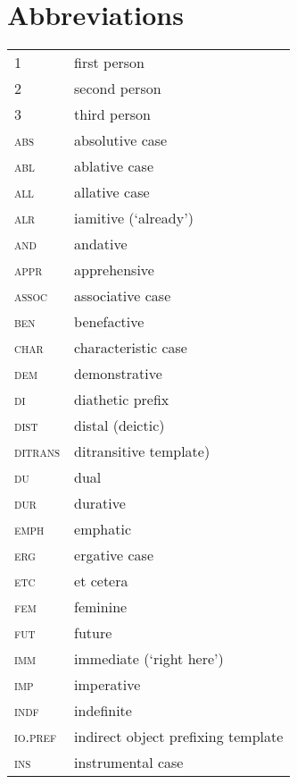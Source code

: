 \documentclass[output=paper]{langscibook}
\begin{document}
\section*{Abbreviations}

\begin{tabularx}{.45\textwidth}{lQ}
        \textsc{1} & {first person}\\
		\textsc{2} & {second person}\\
		\textsc{3} & {third person}\\
		\textsc{abs} & {absolutive case}\\
		\textsc{abl} & {ablative case}\\
		\textsc{all} & {allative case}\\
		\textsc{alr} & {iamitive (`already')}\\
		\textsc{and} & {andative}\\
		\textsc{appr} & {apprehensive}\\
		\textsc{assoc} & {associative case}\\
		\textsc{ben} & {benefactive}\\
		\textsc{char} & {characteristic case}\\
		\textsc{dem} & {demonstrative}\\
		\textsc{di} & {diathetic prefix}\\
		\textsc{dist} & {distal (deictic)}\\
		\textsc{ditrans} & {ditransitive template)}\\
		\textsc{du} & {dual}\\
		\textsc{dur} & {durative}\\
		\textsc{emph} & {emphatic}\\
		\textsc{erg} & {ergative case}\\
		\textsc{etc} & {et cetera}\\
		\textsc{fem} & {feminine}\\
		\textsc{fut} & {future}\\
		\textsc{imm} & {immediate (`right here')}\\
		\textsc{imp} & {imperative}\\
		\textsc{indf} & {indefinite}\\
		\textsc{io.pref} & {indirect object prefixing template}\\
		\textsc{ins} & {instrumental case}\\
		\end{tabularx}
\end{document}
